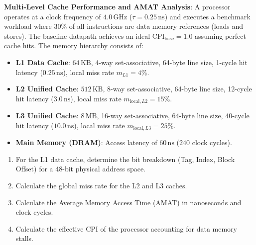 \begin{problem}
\textbf{Multi-Level Cache Performance and AMAT Analysis}:
A processor operates at a clock frequency of $4.0\,\text{GHz}$ ($\tau = 0.25\,\text{ns}$) and executes a benchmark workload where $30\%$ of all instructions are data memory references (loads and stores). The baseline datapath achieves an ideal $\text{CPI}_{\text{base}} = 1.0$ assuming perfect cache hits.
The memory hierarchy consists of:
\begin{itemize}
    \item \textbf{L1 Data Cache}: $64\,\text{KB}$, 4-way set-associative, 64-byte line size, 1-cycle hit latency ($0.25\,\text{ns}$), local miss rate $m_{L1} = 4\%$.
    \item \textbf{L2 Unified Cache}: $512\,\text{KB}$, 8-way set-associative, 64-byte line size, 12-cycle hit latency ($3.0\,\text{ns}$), local miss rate $m_{\text{local}, L2} = 15\%$.
    \item \textbf{L3 Unified Cache}: $8\,\text{MB}$, 16-way set-associative, 64-byte line size, 40-cycle hit latency ($10.0\,\text{ns}$), local miss rate $m_{\text{local}, L3} = 25\%$.
    \item \textbf{Main Memory (DRAM)}: Access latency of $60\,\text{ns}$ ($240$ clock cycles).
\end{itemize}
\begin{enumerate}
    \item For the L1 data cache, determine the bit breakdown (Tag, Index, Block Offset) for a 48-bit physical address space.
    \item Calculate the global miss rate for the L2 and L3 caches.
    \item Calculate the Average Memory Access Time (AMAT) in nanoseconds and clock cycles.
    \item Calculate the effective CPI of the processor accounting for data memory stalls.
\end{enumerate}


\end{problem}
